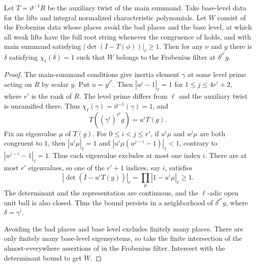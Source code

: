 \begin{lemma}
\label{lem:c-hecke-allowed-frobenii}
\emitthmsource
Let $T=\vartheta^{-1}R$ be the auxiliary twist of the main summand. Take base-level data for the lifts and integral normalized characteristic polynomials. Let $W$ consist of the Frobenius data whose places avoid the bad places and the base level, at which all weak lifts have the full root string whenever the congruence of  holds, and with main summand satisfying $|\det(I-T(\phi))|_\ell\ge1$. Then for any $\nu$ and $g$ there is $\delta$ satisfying $\chi_\ell(\delta)=1$ such that $W$ belongs to the Frobenius filter at $\delta^{\ell^\nu}g$.
\end{lemma}
\begin{proof}
The main-summand conditions give inertia element $\gamma$ at some level prime acting on $R$ by scalar $y$. Put $u=y^{\ell^\nu}$. Then $|u^j-1|_\ell=1$ for $1\le j\le4r'+2$, where $r'$ is the rank of $R$. The level prime differs from $\ell$ and the auxiliary twist is unramified there. Thus $\chi_\ell(\gamma)=\vartheta^{-1}(\gamma)=1$, and
\[
 T((\gamma^i)^{\ell^\nu}g)=u^i T(g).
\]
Fix an eigenvalue $\mu$ of $T(g)$. For $0\le i<j\le r'$, if $u^i\mu$ and $u^j\mu$ are both congruent to $1$, then $|u^i\mu|_\ell=1$ and
$|u^i\mu(u^{j-i}-1)|_\ell<1$, contrary to $|u^{j-i}-1|_\ell=1$. Thus each eigenvalue excludes at most one index $i$. There are at most $r'$ eigenvalues, so one of the $r'+1$ indices, say $i$, satisfies
\[
 |\det(I-u^iT(g))|_\ell=\prod_\mu |1-u^i\mu|_\ell\ge1.
\]
The determinant and the representation are continuous, and the $\ell$-adic open unit ball is also closed. Thus the bound persists in a neighborhood of $\delta^{\ell^\nu}g$, where $\delta=\gamma^i$.

Avoiding the bad places and base level excludes finitely many places. There are only finitely many base-level eigensystems, so take the finite intersection of the almost-everywhere assertions of  in the Frobenius filter. Intersect with the determinant bound to get $W$.
\end{proof}

